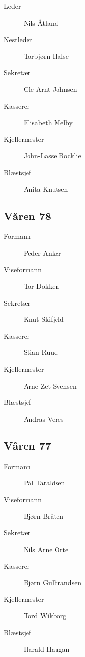 {\begin{minipage}{0.6\textwidth}
\begin{description}
	\item[Leder] Nils Åtland
	\item[Nestleder] Torbjørn Halse
	\item[Sekretær] Ole-Arnt Johnsen
	\item[Kasserer] Elisabeth Melby
	\item[Kjellermester] John-Lasse Bocklie
	\item[Blæstsjef] Anita Knutsen

\end{description}
\subsection*{Våren 78}

\begin{description}
	\item[Formann]  Peder Anker
	\item[Viseformann] Tor Dokken
	\item[Sekretær] Knut Skifjeld
	\item[Kasserer] Stian Ruud
	\item[Kjellermester] Arne Zet Svensen
	\item[Blæstsjef] Andras Veres
\end{description}
\subsection*{Våren 77}

\begin{description}
	\item[Formann]  Pål Taraldsen
	\item[Viseformann] Bjørn Bråten
	\item[Sekretær] Nils Arne Orte
	\item[Kasserer] Bjørn Gulbrandsen
	\item[Kjellermester] Tord Wikborg
	\item[Blæstsjef] Harald Haugan
\end{description}
\end{minipage}
}

